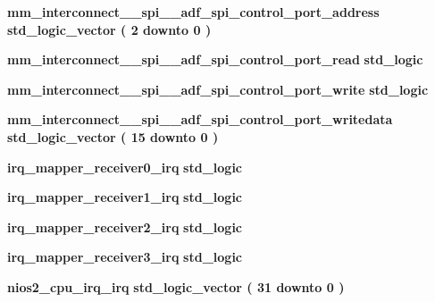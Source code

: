 \begin{DoxyCompactItemize}
\item 
{\bf mm\+\_\+interconnect\+\_\+\_\+spi\+\_\+\_\+adf\+\_\+spi\+\_\+control\+\_\+port\+\_\+address} {\bfseries \textcolor{comment}{std\+\_\+logic\+\_\+vector}\textcolor{vhdlchar}{ }\textcolor{vhdlchar}{(}\textcolor{vhdlchar}{ }\textcolor{vhdlchar}{ } \textcolor{vhdldigit}{2} \textcolor{vhdlchar}{ }\textcolor{keywordflow}{downto}\textcolor{vhdlchar}{ }\textcolor{vhdlchar}{ } \textcolor{vhdldigit}{0} \textcolor{vhdlchar}{ }\textcolor{vhdlchar}{)}\textcolor{vhdlchar}{ }} 
\item 
{\bf mm\+\_\+interconnect\+\_\+\_\+spi\+\_\+\_\+adf\+\_\+spi\+\_\+control\+\_\+port\+\_\+read} {\bfseries \textcolor{comment}{std\+\_\+logic}\textcolor{vhdlchar}{ }} 
\item 
{\bf mm\+\_\+interconnect\+\_\+\_\+spi\+\_\+\_\+adf\+\_\+spi\+\_\+control\+\_\+port\+\_\+write} {\bfseries \textcolor{comment}{std\+\_\+logic}\textcolor{vhdlchar}{ }} 
\item 
{\bf mm\+\_\+interconnect\+\_\+\_\+spi\+\_\+\_\+adf\+\_\+spi\+\_\+control\+\_\+port\+\_\+writedata} {\bfseries \textcolor{comment}{std\+\_\+logic\+\_\+vector}\textcolor{vhdlchar}{ }\textcolor{vhdlchar}{(}\textcolor{vhdlchar}{ }\textcolor{vhdlchar}{ } \textcolor{vhdldigit}{15} \textcolor{vhdlchar}{ }\textcolor{keywordflow}{downto}\textcolor{vhdlchar}{ }\textcolor{vhdlchar}{ } \textcolor{vhdldigit}{0} \textcolor{vhdlchar}{ }\textcolor{vhdlchar}{)}\textcolor{vhdlchar}{ }} 
\item 
{\bf irq\+\_\+mapper\+\_\+receiver0\+\_\+irq} {\bfseries \textcolor{comment}{std\+\_\+logic}\textcolor{vhdlchar}{ }} 
\item 
{\bf irq\+\_\+mapper\+\_\+receiver1\+\_\+irq} {\bfseries \textcolor{comment}{std\+\_\+logic}\textcolor{vhdlchar}{ }} 
\item 
{\bf irq\+\_\+mapper\+\_\+receiver2\+\_\+irq} {\bfseries \textcolor{comment}{std\+\_\+logic}\textcolor{vhdlchar}{ }} 
\item 
{\bf irq\+\_\+mapper\+\_\+receiver3\+\_\+irq} {\bfseries \textcolor{comment}{std\+\_\+logic}\textcolor{vhdlchar}{ }} 
\item 
{\bf nios2\+\_\+cpu\+\_\+irq\+\_\+irq} {\bfseries \textcolor{comment}{std\+\_\+logic\+\_\+vector}\textcolor{vhdlchar}{ }\textcolor{vhdlchar}{(}\textcolor{vhdlchar}{ }\textcolor{vhdlchar}{ } \textcolor{vhdldigit}{31} \textcolor{vhdlchar}{ }\textcolor{keywordflow}{downto}\textcolor{vhdlchar}{ }\textcolor{vhdlchar}{ } \textcolor{vhdldigit}{0} \textcolor{vhdlchar}{ }\textcolor{vhdlchar}{)}\textcolor{vhdlchar}{ }} 

\end{DoxyCompactItemize}

